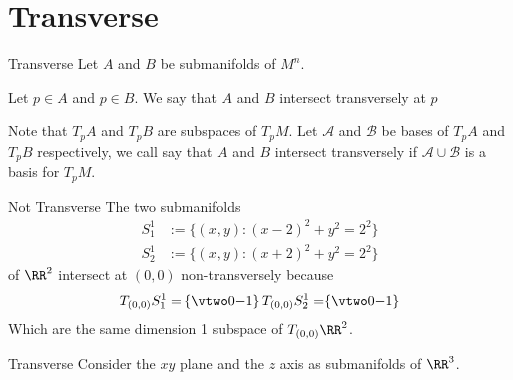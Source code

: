 \section{Transverse}

\begin{boxDefinition}{Transverse}
Let \( A \) and \( B \) be submanifolds of \( M^n \).

Let \( p \in A \) and \( p \in B \).
We say that \( A \) and \( B \) intersect transversely at \( p \)

Note that \( T_pA \) and \( T_pB \) are subspaces of \( T_pM \).
Let \( \mathcal A \) and \( \mathcal B \) be bases of \( T_pA \) and \(T_pB \) respectively,
    we call say that \( A \) and \( B \) intersect transversely if \( \mathcal A \cup \mathcal B \) is a basis for \( T_pM \).
\end{boxDefinition}
\begin{boxExample}{Not Transverse}
The two submanifolds
\begin{align*} 
    S_1^1 &:= \{ (x,y) : (x-2)^2 + y^2 = 2^2 \}
    \\
    S_2^1 &:= \{ (x,y) : (x+2)^2 + y^2 = 2^2 \}
\end{align*}
of \( \RR^2 \) intersect at \( (0, 0) \) non-transversely because 
\begin{align*} 
    T_{(0,0)}S_1^1 = \span \left\{ \vtwo 0{-1} \right\}
    T_{(0,0)}S_2^1 = \span \left\{ \vtwo 0{-1} \right\}
\end{align*}
Which are the same dimension 1 subspace of \( T_{(0,0)}\RR^2 \).
\end{boxExample}
\begin{boxExample}{Transverse}
Consider the \( xy \) plane and the \( z \) axis as submanifolds of \( \RR^3 \).
\end{boxExample}
